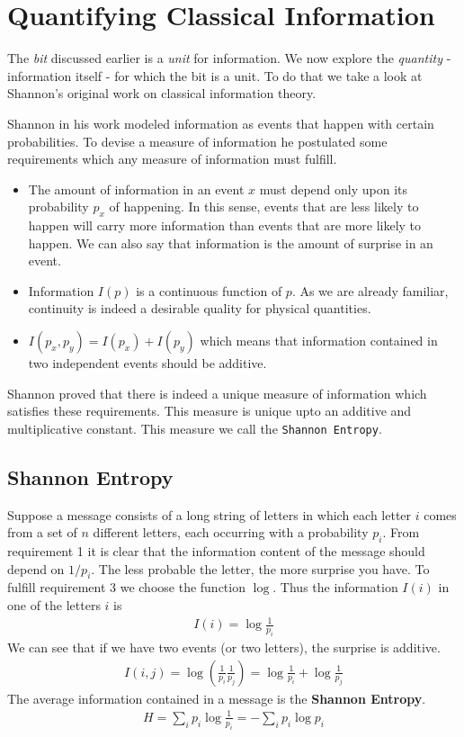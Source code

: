\section{Quantifying Classical Information}
The \textit{bit} discussed earlier is a \textit{unit} for information. We now explore the \textit{quantity} - information itself - for which the bit is a unit. To do that we take a look at Shannon's original work on classical information theory.
\par Shannon in his work modeled information as events that happen with certain probabilities. To devise a measure of information he postulated some requirements which any measure of information must fulfill.
\begin{itemize}
\item The amount of information in an event $x$ must depend only upon its probability $p_x$ of happening. In this sense, events that are less likely to happen will carry more information than events that are more likely to happen. We can also say that information is the amount of surprise in an event.
\item Information $I(p)$ is a continuous function of $p$. As we are already familiar, continuity is indeed a desirable quality for physical quantities.
\item $I(p_x,p_y)=I(p_x)+I(p_y)$ which means that information contained in two independent events should be additive.
\end{itemize}
\par Shannon proved that there is indeed a unique measure of information which satisfies these requirements. This measure is unique upto an additive and multiplicative constant. This measure we call the \texttt{Shannon Entropy}.

\subsection{Shannon Entropy}
\par Suppose a message consists of a long string of letters in which each letter $i$ comes from a set of $n$ different letters, each occurring with a probability $p_i$. From requirement 1 it is clear that the information content of the message should depend on $1/p_i$. The less probable the letter, the more surprise you have. To fulfill requirement 3 we choose the function $\log$. Thus the information $I(i)$ in one of the letters $i$ is
\begin{align*}
I(i) = \log\frac{1}{p_i}
\end{align*}
We can see that if we have two events (or two letters), the surprise is additive.
\begin{align*}
I(i,j)= \log(\frac{1}{p_i}\frac{1}{p_j}) = \log\frac{1}{p_i} + \log\frac{1}{p_j}
\end{align*}
The average information contained in a message is the \textbf{Shannon Entropy}.
\begin{align*}
H = \sum_i p_i \log \frac{1}{p_i} = - \sum_i p_i \log p_i
\end{align*}

